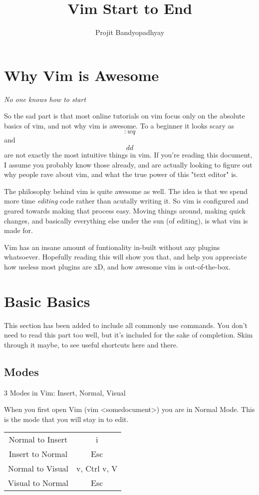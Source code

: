 \documentclass[12pt, letterpaper]{article}
\title{Vim Start to End}
\author{Projit Bandyopadhyay}
\begin{document}
 \maketitle 


\section{Why Vim is Awesome}
\textit{No one knows how to start}

So the sad part is that most online tutorials on vim focus only on the absolute basics of vim, and not why vim is awesome. To a beginner it looks scary as $$:wq$$ and $$dd$$ are not exactly the most intuitive things in vim. If you're reading this document, I assume you probably know those already, and are actually looking to figure out why people rave about vim, and what the true power of this "text editor" is.

The philosophy behind vim is quite awesome as well. The idea is that we spend more time \textit{editing} code rather than acutally writing it. So vim is configured and geared towards making that process easy. Moving things around, making quick changes, and basically everything else under the sun (of editing), is what vim is made for.

Vim has an insane amount of funtionality in-built without any plugins whatsoever. Hopefully reading this will show you that, and help you appreciate how useless most plugins are xD, and how awesome vim is out-of-the-box.


\section{Basic Basics}
This section has been added to include all commonly use commands. You don't need to read this part too well, but it's included for the sake of completion. Skim through it maybe, to see useful shortcuts here and there.

\subsection{Modes}
3 Modes in Vim: Insert, Normal, Visual

When you first open Vim (vim <somedocument>) you are in Normal Mode. This is the mode that you will stay in to edit.

\begin{table}[H]
    \begin{tabular}{|c|c|}
        Normal to Insert & i \\

        Insert to Normal & Esc \\

        Normal to Visual & v, Ctrl v, V \\

        Visual to Normal & Esc \\
    \end{tabular}
\end{table}
\end{document}
